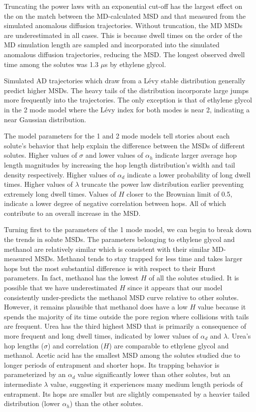\documentclass{article}
\begin{document}
  Truncating the power laws with an exponential cut-off has the largest effect on the on 
  the match between the MD-calculated MSD and that measured from the simulated anomalous
  diffusion trajectories. Without truncation, the MD MSDs are underestimated in all cases.
  This is because dwell times on the order of the MD simulation length are sampled and 
  incorporated into the simulated anomalous diffusion trajectories, reducing the MSD. 
  The longest observed dwell time among the solutes was 1.3 $\mu$s by ethylene glycol.
  
  Simulated AD trajectories which draw from a L\'evy stable distribution generally 
  predict higher MSDs. The heavy tails of the distribution incorporate large
  jumps more frequently into the trajectories. The only exception is that of ethylene
  glycol in the 2 mode model where the L\'evy index for both modes is near 2, indicating
  a near Gaussian distribution.
  
  The model parameters for the 1 and 2 mode models tell stories about each solute's
  behavior that help explain the difference between the MSDs of different solutes. 
  Higher values of $\sigma$ and lower values of $\alpha_h$ indicate larger average 
  hop length magnitudes by increasing the hop length distribution's width and tail 
  density respectively. Higher values of $\alpha_d$ indicate a lower probability of 
  long dwell times. Higher values of $\lambda$ truncate the power law distribution 
  earlier preventing extremely long dwell times. Values of $H$ closer to the Brownian
  limit of 0.5, indicate a lower degree of negative correlation between hops. All 
  of which contribute to an overall increase in the MSD.
  
  Turning first to the parameters of the 1 mode model, we can begin to break down the
  trends in solute MSDs. The parameters belonging to ethylene glycol and methanol are
  relatively similar which is consistent with their similar MD-measured MSDs. Methanol 
  tends to stay trapped for less time and takes larger hops but the most substantial
  difference is with respect to their Hurst parameters. In fact, methanol has the lowest
  $H$ of all the solutes studied. It is possible that we have underestimated $H$ since 
  it appears that our model consistently under-predicts the methanol MSD curve relative
  to other solutes. However, it remains plausible that methanol does have a low $H$ 
  value because it spends the majority of its time outside the pore region where collisions
  with tails are frequent. Urea has the third highest MSD that is primarily a consequence of
  more frequent and long dwell times, indicated by lower values of $\alpha_d$ and 
  $\lambda$. Urea's hop lengths ($\sigma$) and correlation ($H$) are comparable to ethylene
  glycol and methanol. Acetic acid has the smallest MSD among the solutes studied due 
  to longer periods of entrapment and shorter hops. Its trapping behavior is parameterized
  by an $\alpha_d$ value significantly lower than other solutes, but an intermediate 
  $\lambda$ value, suggesting it experiences many medium length periods of entrapment. 
  Its hops are smaller but are slightly compensated by a heavier tailed distribution 
  (lower $\alpha_h$) than the other solutes. 
  
\end{document}
